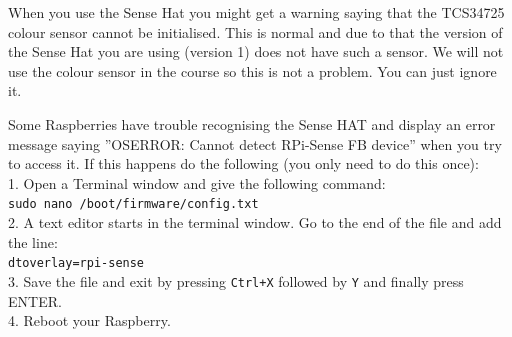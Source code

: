 \documentclass{article}
\begin{document}
\parbox[t]{14cm}{When you use the Sense Hat you might get a warning saying that the TCS34725 colour sensor cannot be initialised. This is normal and due to that the version of the Sense Hat you are using (version 1) does not have such a sensor. We will not use the colour sensor in the course so this is not a problem. You can just ignore it.}

\parbox[t]{14cm}{Some Raspberries have trouble recognising the Sense HAT and display an error message saying ''OSERROR: Cannot detect RPi-Sense FB device'' when you try to access it. If this happens do the following (you only need to do this once):\\1. Open a Terminal window and give the following command:\\\texttt{sudo nano /boot/firmware/config.txt}\\2. A text editor starts in the terminal window. Go to the end of the file and add the line:\\\texttt{dtoverlay=rpi-sense}\\3. Save the file and exit by pressing \texttt{Ctrl+X} followed by \texttt{Y} and finally press ENTER.\\4. Reboot your Raspberry.}
\end{document}
